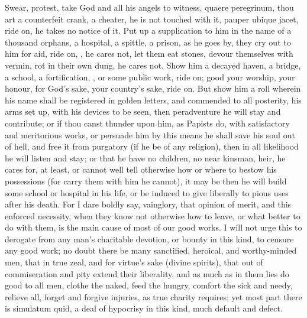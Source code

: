 {Swear, protest, take God and all his angels to witness, quaere
peregrinum, thou art a counterfeit crank, a cheater, he is not touched
with it, pauper ubique jacet, ride on, he takes no notice of it. Put up
a supplication to him in the name of a thousand orphans, a hospital, a
spittle, a prison, as he goes by, they cry out to him for aid, ride on,
, he cares not, let them eat stones, devour themselves with
vermin, rot in their own dung, he cares not. Show him a decayed haven,
a bridge, a school, a fortification, \etc{}, or some public work, ride
on; good your worship, your honour, for God's sake, your country's
sake, ride on. But show him a roll wherein his name shall be registered
in golden letters, and commended to all posterity, his arms set up,
with his devices to be seen, then peradventure he will stay and
contribute; or if thou canst thunder upon him, as Papists do, with
satisfactory and meritorious works, or persuade him by this means he
shall save his soul out of hell, and free it from purgatory (if he be
of any religion), then in all likelihood he will listen and stay; or
that he have no children, no near kinsman, heir, he cares for, at
least, or cannot well tell otherwise how or where to bestow his
possessions (for carry them with him he cannot), it may be then he will
build some school or hospital in his life, or be induced to give
liberally to pious uses after his death. For I dare boldly say,
vainglory, that opinion of merit, and this enforced necessity, when
they know not otherwise how to leave, or what better to do with them,
is the main cause of most of our good works. I will not urge this to
derogate from any man's charitable devotion, or bounty in this kind, to
censure any good work; no doubt there be many sanctified, heroical, and
worthy-minded men, that in true zeal, and for virtue's sake (divine
spirits), that out of commiseration and pity extend their liberality,
and as much as in them lies do good to all men, clothe the naked, feed
the hungry, comfort the sick and needy, relieve all, forget and forgive
injuries, as true charity requires; yet most part there is simulatum
quid, a deal of hypocrisy in this kind, much default and defect.

}
